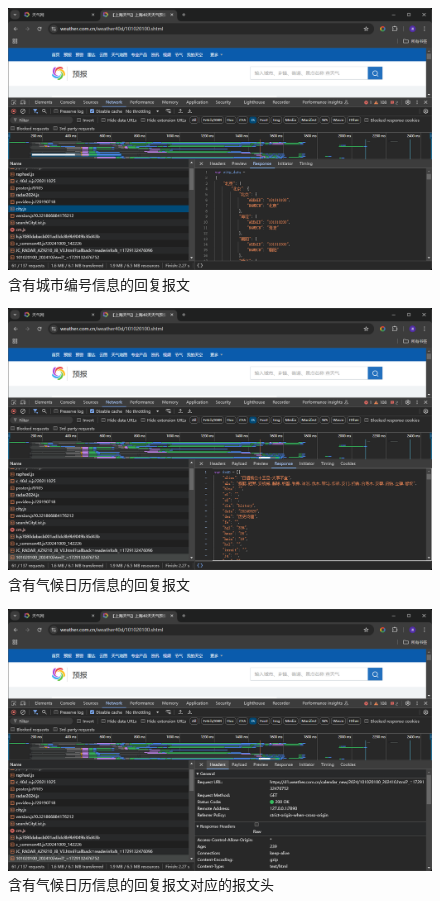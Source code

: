 \begin{figure}[!htbp]
    \centering
    \includegraphics[width=\textwidth]{figures/city.js.png}
    \caption{含有城市编号信息的回复报文}\label{cityjs}
\end{figure}

\begin{figure}[!htbp]
    \centering
    \includegraphics[width=\textwidth]{figures/calendar_response.png}
    \caption{含有气候日历信息的回复报文}\label{calenderresponse}
\end{figure}

\begin{figure}[!htbp]
    \centering
    \includegraphics[width=\textwidth]{figures/calendar_header.png}
    \caption{含有气候日历信息的回复报文对应的报文头}\label{calenderheader}
\end{figure}

